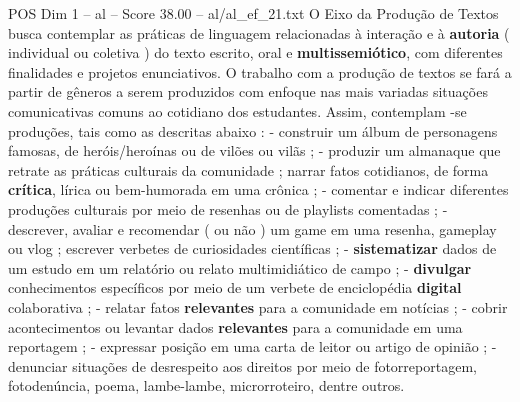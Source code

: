 \begin{textsample}{POS Dim 1 – al – Score 38.00 – al/al\_ef\_21.txt}
O Eixo da Produção de Textos busca contemplar as práticas de linguagem relacionadas à interação e à \textbf{autoria} ( individual ou coletiva ) do texto escrito, oral e \textbf{multissemiótico}, com diferentes finalidades e projetos enunciativos.
O trabalho com a produção de textos se fará a partir de gêneros a serem produzidos com enfoque nas mais variadas situações comunicativas comuns ao cotidiano dos estudantes.
Assim, contemplam -se produções, tais como as descritas abaixo : - construir um álbum de personagens famosas, de heróis/heroínas ou de vilões ou vilãs ; - produzir um almanaque que retrate as práticas culturais da comunidade ; narrar fatos cotidianos, de forma \textbf{crítica}, lírica ou bem-humorada em uma crônica ; - comentar e indicar diferentes produções culturais por meio de resenhas ou de playlists comentadas ; - descrever, avaliar e recomendar ( ou não ) um game em uma resenha, gameplay ou vlog ; escrever verbetes de curiosidades científicas ; - \textbf{sistematizar} dados de um estudo em um relatório ou relato multimidiático de campo ; - \textbf{divulgar} conhecimentos específicos por meio de um verbete de enciclopédia \textbf{digital} colaborativa ; - relatar fatos \textbf{relevantes} para a comunidade em notícias ; - cobrir acontecimentos ou levantar dados \textbf{relevantes} para a comunidade em uma reportagem ; - expressar posição em uma carta de leitor ou artigo de opinião ; - denunciar situações de desrespeito aos direitos por meio de fotorreportagem, fotodenúncia, poema, lambe-lambe, microrroteiro, dentre outros.

\end{textsample}
